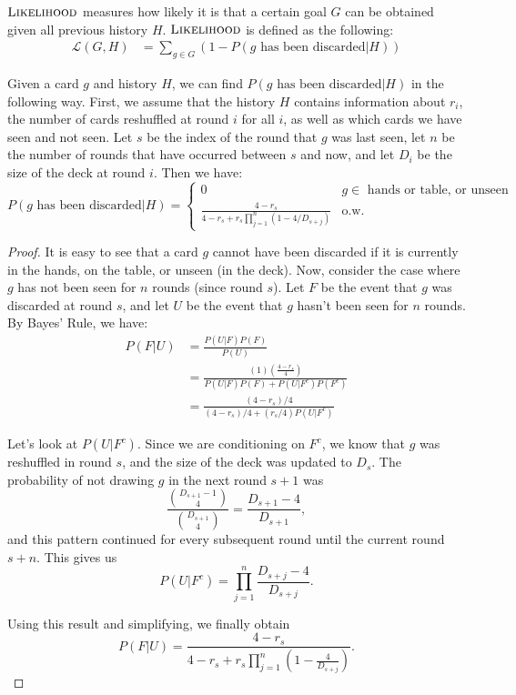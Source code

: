 \documentclass[11pt]{article}
\newcommand{\lkhd}{\textsc{Likelihood}}
\begin{document}
$\lkhd$ measures how likely it is that a certain goal $G$ can be obtained given all previous history $H$. $\lkhd$ is defined as the following:
\begin{align}
  \mathcal{L}(G,H) &= \sum_{g \in G} (1 - P(g \text{ has been discarded}|H))
\end{align}

Given a card $g$ and history $H$, we can find $P(g \text{ has been discarded}|H)$ in the following way. First, we assume that the history $H$ contains information about $r_i$, the number of cards reshuffled at round $i$ for all $i$, as well as which cards we have seen and not seen. Let $s$ be the index of the round that $g$ was last seen, let $n$ be the number of rounds that have occurred between $s$ and now, and let $D_i$ be the size of the deck at round $i$. Then we have:
\begin{equation}
P(g \text{ has been discarded}|H) = \begin{cases}
  0 & g \in \text{ hands or table, or unseen} \\
  \frac{4-r_s}{4-r_s+r_s\prod_{j=1}^n(1-4/{D_{s+j}})} & \text{o.w.}
\end{cases}
\label{eq:p-discarded} \end{equation}

\begin{proof}
  It is easy to see that a card $g$ cannot have been discarded if it is currently in the hands, on the table, or unseen (in the deck). Now, consider the case where $g$ has not been seen for $n$ rounds (since round $s$). Let $F$ be the event that $g$ was discarded at round $s$, and let $U$ be the event that $g$ hasn't been seen for $n$ rounds. By Bayes' Rule, we have:
\begin{align}
  P(F|U) &= \frac{P(U|F)P(F)}{P(U)} \\
  &= \frac{(1)\left(\frac{4-r_s}{4}\right)}{P(U|F)P(F) + P(U|F^c)P(F^c)} \\
  &= \frac{(4-r_s)/4}{(4-r_s)/4 + (r_s/4)P(U|F^c)}
\end{align}

Let's look at $P(U|F^c)$. Since we are conditioning on $F^c$, we know that $g$ was reshuffled in round $s$, and the size of the deck was updated to $D_s$. The probability of not drawing $g$ in the next round $s+1$ was
\begin{equation}
  \frac{{D_{s+1}-1 \choose 4}}{{D_{s+1} \choose 4}} = \frac{D_{s+1}-4}{D_{s+1}},
\end{equation} and this pattern continued for every subsequent round until the current round $s+n$. This gives us
\begin{equation}
  P(U|F^c) = \prod_{j=1}^n \frac{D_{s+j} - 4}{D_{s+j}}.
\end{equation}

Using this result and simplifying, we finally obtain
\begin{equation}
  P(F|U) = \frac{4-r_s}{4-r_s+r_s\prod_{j=1}^n(1-\frac{4}{{D_{s+j}}})}.
\end{equation}
\end{proof}
\end{document}

